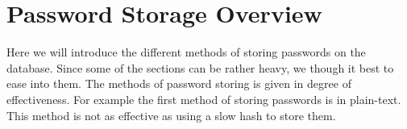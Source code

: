 \documentclass[12pt]{article}
\begin{document}
\newpage
\setcounter{section}{0}
\section{Password Storage Overview}
Here we will introduce the different methods of storing passwords on the database. Since some of the sections can be rather heavy, we though it best to ease into them. The methods of password storing is given in degree of effectiveness. For example the first method of storing passwords is in plain-text. This method is not as effective as using a slow hash to store them.
\end{document}
